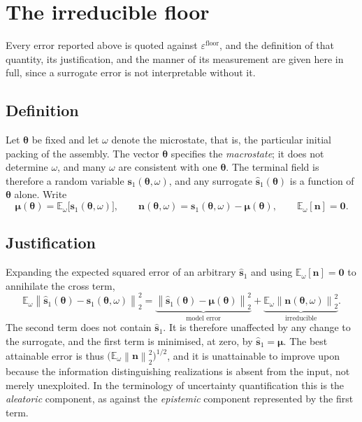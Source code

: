 \documentclass[11pt]{article}
\newcommand{\E}{\mathbb{E}}
\newcommand{\bs}[1]{\boldsymbol{#1}}
\newcommand{\norm}[1]{\left\lVert #1 \right\rVert}
\begin{document}
\section{The irreducible floor}
\label{sec:floor-theory}

Every error reported above is quoted against $\varepsilon^{\text{floor}}$, and the definition of that
quantity, its justification, and the manner of its measurement are given here in full, since a
surrogate error is not interpretable without it.

\subsection{Definition}

Let $\bs{\theta}$ be fixed and let $\omega$ denote the microstate, that is, the particular initial
packing of the assembly. The vector $\bs{\theta}$ specifies the \emph{macrostate}; it does not
determine $\omega$, and many $\omega$ are consistent with one $\bs{\theta}$. The terminal field is
therefore a random variable $\bs{s}_1(\bs{\theta}, \omega)$, and any surrogate
$\hat{\bs{s}}_1(\bs{\theta})$ is a function of $\bs{\theta}$ alone. Write
\begin{equation}
  \bs{\mu}(\bs{\theta}) = \E_\omega \big[ \bs{s}_1(\bs{\theta}, \omega) \big],
  \qquad
  \bs{n}(\bs{\theta}, \omega) = \bs{s}_1(\bs{\theta}, \omega) - \bs{\mu}(\bs{\theta}),
  \qquad \E_\omega[\bs{n}] = \bs{0}.
  \label{eq:decomposition}
\end{equation}

\subsection{Justification}

Expanding the expected squared error of an arbitrary $\hat{\bs{s}}_1$ and using
$\E_\omega[\bs{n}] = \bs{0}$ to annihilate the cross term,
\begin{equation}
  \E_\omega \norm{ \hat{\bs{s}}_1(\bs{\theta}) - \bs{s}_1(\bs{\theta}, \omega) }_2^2
  = \underbrace{\norm{ \hat{\bs{s}}_1(\bs{\theta}) - \bs{\mu}(\bs{\theta}) }_2^2}_{\text{model error}}
  + \underbrace{\E_\omega \norm{ \bs{n}(\bs{\theta}, \omega) }_2^2}_{\text{irreducible}} .
  \label{eq:bias-variance}
\end{equation}
The second term does not contain $\hat{\bs{s}}_1$. It is therefore unaffected by any change to the
surrogate, and the first term is minimised, at zero, by $\hat{\bs{s}}_1 = \bs{\mu}$. The best
attainable error is thus $\big( \E_\omega \norm{\bs{n}}_2^2 \big)^{1/2}$, and it is unattainable to
improve upon because the information distinguishing realizations is absent from the input, not merely
unexploited. In the terminology of uncertainty quantification this is the \emph{aleatoric} component,
as against the \emph{epistemic} component represented by the first term.
\end{document}
